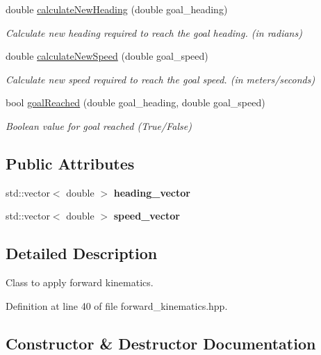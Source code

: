 \begin{DoxyCompactItemize}
double \hyperlink{classForwardKinematics_a005d9cbb53f4dbb79b16defb52a8e76a}{calculate\+New\+Heading} (double goal\+\_\+heading)
\begin{DoxyCompactList}\small\item\em Calculate new heading required to reach the goal heading. (in radians) \end{DoxyCompactList}\item 
double \hyperlink{classForwardKinematics_af945b5d3d508aba54ea902674a65373c}{calculate\+New\+Speed} (double goal\+\_\+speed)
\begin{DoxyCompactList}\small\item\em Calculate new speed required to reach the goal speed. (in meters/seconds) \end{DoxyCompactList}\item 
bool \hyperlink{classForwardKinematics_ab5b26d5bc5c63148a7efa8361a851066}{goal\+Reached} (double goal\+\_\+heading, double goal\+\_\+speed)
\begin{DoxyCompactList}\small\item\em Boolean value for goal reached (True/\+False) \end{DoxyCompactList}\end{DoxyCompactItemize}
\subsection*{Public Attributes}
\begin{DoxyCompactItemize}
\item 
\mbox{\label{classForwardKinematics_a7383b93f21d29c6a3db88533a809f28c}} 
std\+::vector$<$ double $>$ {\bfseries heading\+\_\+vector}
\item 
\mbox{\label{classForwardKinematics_a8dd3201e71a1139616fb6ce329cd7df7}} 
std\+::vector$<$ double $>$ {\bfseries speed\+\_\+vector}
\end{DoxyCompactItemize}


\subsection{Detailed Description}
Class to apply forward kinematics. 

Definition at line 40 of file forward\+\_\+kinematics.\+hpp.



\subsection{Constructor \& Destructor Documentation}
\mbox{\label{classForwardKinematics_aff7ff4cb9cf2c523b111f2c5f2ec5cc8}} 
